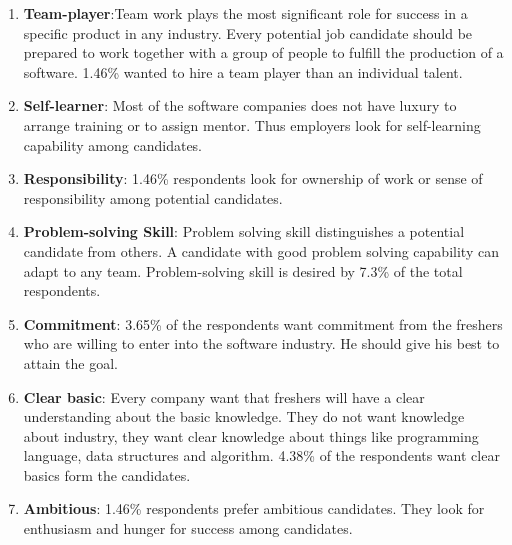 \begin{enumerate}
    \item \textbf{Team-player}:Team work plays the most significant role for success in a specific product in any industry. Every potential job candidate should be prepared to work together with a group of people to fulfill the production of a software. 1.46\% wanted to hire a team player than an individual talent.
    
    
    \item\textbf{Self-learner}: Most of the software companies does not have luxury to arrange training or to assign mentor. Thus employers look for self-learning capability among candidates.
    
    \item\textbf{Responsibility}: 1.46\% respondents look for ownership of work or sense of responsibility among potential candidates.
    
    
    \item\textbf{Problem-solving Skill}: Problem solving skill distinguishes a potential candidate from others. A candidate with good problem solving capability can adapt to any team. Problem-solving skill is desired by 7.3\% of the total respondents.
    
    \item\textbf{Commitment}: 3.65\% of the respondents want commitment from the freshers who are willing to enter into the software industry. He should give his best to attain the goal.
    
    \item \textbf{Clear basic}: Every company want that freshers will have a clear understanding about the basic knowledge. They do not want knowledge about industry, they want clear knowledge about things like programming language, data structures and algorithm. 4.38\% of the respondents want clear basics form the candidates.
    
    \item\textbf{Ambitious}: 1.46\% respondents prefer ambitious candidates. They look for enthusiasm and hunger for success among candidates.
\end{enumerate}


